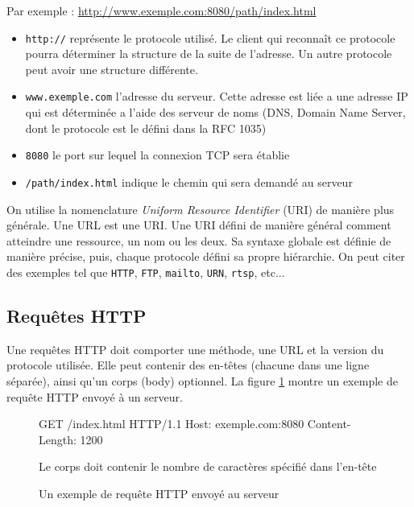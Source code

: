 \documentclass[a4paper, 11pt]{article}
\begin{document}
{		Par exemple : \url{http://www.exemple.com:8080/path/index.html} 
		
		\begin{itemize}
			\item \verb$http://$ représente le protocole utilisé. Le client qui reconnaît ce protocole pourra déterminer la structure de la suite de l'adresse. Un autre protocole peut avoir une structure différente.
			\item \verb$www.exemple.com$ l'adresse du serveur. Cette adresse est liée a une adresse IP qui est déterminée a l'aide des serveur de noms (DNS, Domain Name Server, dont le protocole est le défini dans la RFC 1035)
			\item \verb$8080$ le port sur lequel la connexion TCP sera établie
			\item \verb$/path/index.html$ indique le chemin qui sera demandé au serveur
		\end{itemize}
		
		On utilise la nomenclature \emph{Uniform Resource Identifier} (URI) de manière plus générale. Une URL est une URI. Une URI défini de manière général comment atteindre une ressource, un nom ou les deux. Sa syntaxe globale est définie de manière précise, puis, chaque protocole défini sa propre hiérarchie. On peut citer des exemples tel que \texttt{HTTP}, \texttt{FTP}, \texttt{mailto}, \texttt{URN}, \texttt{rtsp}, etc...
		
	\subsection{Requêtes HTTP}
	
		Une requêtes HTTP doit comporter une méthode, une URL et la version du protocole utilisée. Elle peut contenir des en-têtes (chacune dans une ligne séparée), ainsi qu'un corps (body) optionnel. La figure \ref{fig:req_http} montre un exemple de requête HTTP envoyé à un serveur.
		
		\begin{figure}[ht]
		\begin{center}
		\begin{boxedverbatim}
			GET /index.html HTTP/1.1
			Host: exemple.com:8080
			Content-Length: 1200
			
			Le corps doit contenir le nombre de caractères spécifié dans l'en-tête
		\end{boxedverbatim}
		\caption{Un exemple de requête HTTP envoyé au serveur}
		\label{fig:req_http}
		\end{center}
		\end{figure}
		
}
\end{document}
